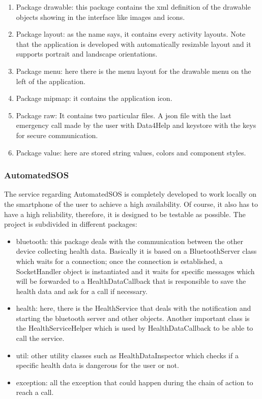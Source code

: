 \begin{enumerate}
\item Package drawable: this package contains the xml definition of the drawable objects showing in the interface like images and icons.
\item Package layout: as the name says, it contains every activity layouts. Note that the application is developed with automatically resizable layout and it supports portrait and landscape orientations.
\item Package menu: here there is the menu layout for the drawable menu on the left of the application.
\item Package mipmap: it contains the application icon.
\item Package raw: It contains two particular files. A json file with the last emergency call made by the user with Data4Help and keystore with the keys for secure communication.
\item Package value: here are stored string values, colors and component styles. 
\end{enumerate}

\subsubsection{AutomatedSOS}
The service regarding AutomatedSOS is completely developed to work locally on the smartphone of the user to achieve a high availability. Of course, it also has to have a high reliability, therefore, it is designed to be testable as possible. The project is subdivided in different packages:
\begin{itemize}
	\item bluetooth: this package deals with the communication between the other device collecting health data. Basically it is based on a BluetoothServer class which waits for a connection; once the connection is established, a SocketHandler object is instantiated and it waits for specific messages which will be forwarded to a HealthDataCallback that is responsible to save the health data and ask for a call if necessary.
	\item health: here, there is the HealthService that deals with the notification and starting the bluetooth server and other objects. Another important class is the HealthServiceHelper which is used by HealthDataCallback to be able to call the service.
	\item util: other utility classes such as HealthDataInspector which checks if a specific health data is dangerous for the user or not.
	\item exception: all the exception that could happen during the chain of action to reach a call.
\end{itemize}

